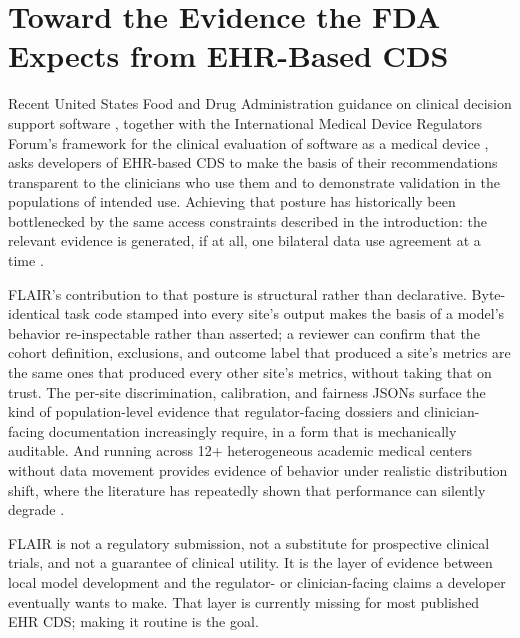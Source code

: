 \section{Toward the Evidence the FDA Expects from EHR-Based CDS}
\label{sec:fda}

Recent United States Food and Drug Administration guidance on clinical
decision support software \citep{fda2022cds}, together with the
International Medical Device Regulators Forum's framework for the
clinical evaluation of software as a medical device
\citep{imdrf2017samd}, asks developers of EHR-based CDS to make the
basis of their recommendations transparent to the clinicians who use
them and to demonstrate validation in the populations of intended
use. Achieving that posture has historically been bottlenecked by the
same access constraints described in the introduction: the relevant
evidence is generated, if at all, one bilateral data use agreement at
a time \citep{finlayson2021clinicianshift,koch2024distributionshift,soin2025shiftremediation}.

FLAIR's contribution to that posture is structural rather than
declarative. Byte-identical task code stamped into every site's output
makes the basis of a model's behavior re-inspectable rather than
asserted; a reviewer can confirm that the cohort definition,
exclusions, and outcome label that produced a site's metrics are the
same ones that produced every other site's metrics, without taking
that on trust. The per-site discrimination, calibration, and fairness
JSONs surface the kind of population-level evidence that
regulator-facing dossiers and clinician-facing documentation
increasingly require, in a form that is mechanically auditable. And
running across 12+ heterogeneous academic medical centers without data
movement provides evidence of behavior under realistic distribution
shift, where the literature has repeatedly shown that performance can
silently degrade
\citep{wong2021external,finlayson2021clinicianshift,koch2024distributionshift}.

FLAIR is not a regulatory submission, not a substitute for prospective
clinical trials, and not a guarantee of clinical utility. It is the
layer of evidence between local model development and the
regulator- or clinician-facing claims a developer eventually wants to
make. That layer is currently missing for most published EHR CDS;
making it routine is the goal.

